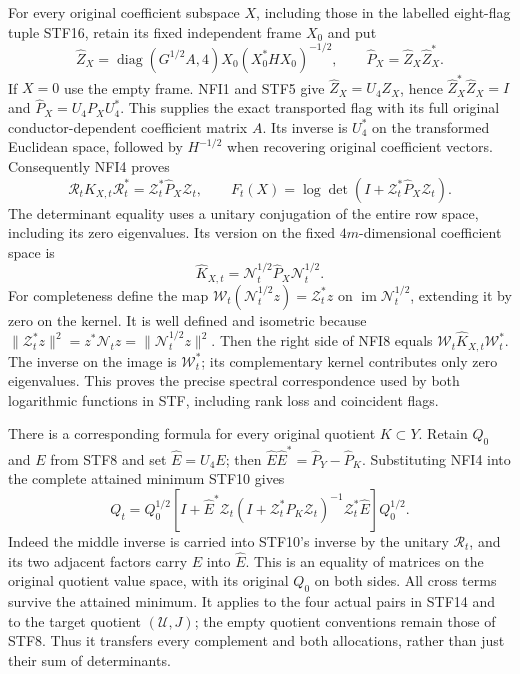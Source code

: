 \documentclass[11pt,a4paper]{article}
\begin{document}
For every original coefficient subspace $X$, including those in the
labelled eight-flag tuple STF16, retain its fixed independent frame $X_0$
and put
\[
 \widehat Z_X=
  \operatorname{diag}(G^{1/2}A,4)X_0(X_0^*HX_0)^{-1/2},
 \qquad \widehat P_X=\widehat Z_X\widehat Z_X^*.
                                                               \tag{NFI7}
\]
If $X=0$ use the empty frame. NFI1 and STF5 give
$\widehat Z_X=U_4Z_X$, hence
$\widehat Z_X^*\widehat Z_X=I$ and
$\widehat P_X=U_4P_XU_4^*$. This supplies the exact transported
flag with its full original conductor-dependent coefficient matrix
$A$. Its inverse is $U_4^*$ on the transformed Euclidean space,
followed by $H^{-1/2}$ when recovering original coefficient vectors.
Consequently NFI4 proves
\[
 \mathscr R_tK_{X,t}\mathscr R_t^*
       =\mathscr Z_t^*\widehat P_X\mathscr Z_t,
 \qquad
 F_t(X)=\log\det(I+\mathscr Z_t^*\widehat P_X\mathscr Z_t).
                                                               \tag{NFI8}
\]
The determinant equality uses a unitary conjugation of the entire
row space, including its zero eigenvalues. Its version on the fixed
$4m$-dimensional coefficient space is
\[
 \widehat K_{X,t}=\mathscr N_t^{1/2}\widehat P_X
                                  \mathscr N_t^{1/2}.
                                                               \tag{NFI9}
\]
For completeness define the map
$\mathcal W_t(\mathscr N_t^{1/2}z)=\mathscr Z_t^*z$ on
$\operatorname{im}\mathscr N_t^{1/2}$, extending it by zero on
the kernel. It is well defined and isometric because
$\|\mathscr Z_t^*z\|^2=z^*\mathscr N_tz
=\|\mathscr N_t^{1/2}z\|^2$.
Then the right side of NFI8 equals
$\mathcal W_t\widehat K_{X,t}\mathcal W_t^*$.
The inverse on the image is $\mathcal W_t^*$; its complementary
kernel contributes only zero eigenvalues. This proves the precise
spectral correspondence used by both logarithmic functions in STF,
including rank loss and coincident flags.

There is a corresponding formula for every original quotient
$K\subset Y$. Retain $Q_0$ and $E$ from STF8 and set
$\widehat E=U_4E$; then
$\widehat E\widehat E^*=\widehat P_Y-\widehat P_K$.
Substituting NFI4 into the complete attained minimum STF10 gives
\[
 Q_t=Q_0^{1/2}\left[I+
 \widehat E^*\mathscr Z_t
 (I+\mathscr Z_t^*\widehat P_K\mathscr Z_t)^{-1}
 \mathscr Z_t^*\widehat E\right]Q_0^{1/2}.
                                                               \tag{NFI10}
\]
Indeed the middle inverse is carried into STF10's inverse by the
unitary $\mathscr R_t$, and its two adjacent factors carry
$E$ into $\widehat E$. This is an equality of matrices on the
original quotient value space, with its original $Q_0$ on both
sides. All cross terms survive the attained minimum. It applies
to the four actual pairs in STF14 and to the target quotient
$(\mathcal U,J)$; the empty quotient conventions remain those
of STF8. Thus it transfers every complement and both allocations,
rather than just their sum of determinants.
\end{document}
